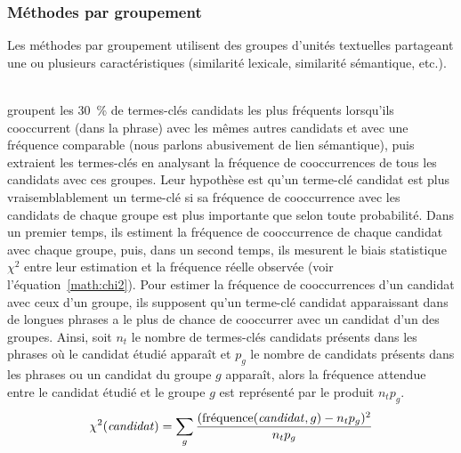       \subsubsection{Méthodes par groupement}
      \label{subsubsec:main-state_of_the_art-automatic_keyphrase_extraction-unsupervised_keyphrase_extraction-clustering_approaches}
        Les méthodes par groupement utilisent des groupes d'unités textuelles
        partageant une ou plusieurs caractéristiques (similarité lexicale,
        similarité sémantique, etc.).

        ~\\ groupent les 30~\% de termes-clés
        candidats les plus fréquents lorsqu'ils cooccurrent (dans la phrase) avec les
        mêmes autres candidats et avec une fréquence comparable (nous parlons
        abusivement de lien sémantique), puis extraient les ter\-mes-clés en
        analysant la fréquence de cooccurrences de tous les candidats avec ces groupes.
        Leur hypothèse est qu'un terme-clé candidat est plus vraisemblablement un
        terme-clé si sa fréquence de cooccurrence avec les candidats de chaque
        groupe est plus importante que selon toute probabilité. Dans un premier
        temps, ils estiment la fréquence de cooccurrence de chaque candidat avec
        chaque groupe, puis, dans un second temps, ils mesurent le biais
        statistique $\chi^2$ entre leur estimation et la fréquence réelle
        observée (voir l'équation~\ref{math:chi2}). Pour estimer la fréquence de
        cooccurrences d'un candidat avec ceux d'un groupe, ils supposent qu'un
        terme-clé candidat apparaissant dans de longues phrases a le plus de
        chance de cooccurrer avec un candidat d'un des groupes. Ainsi, soit
        $n_t$ le nombre de termes-clés candidats présents dans les phrases où le
        candidat étudié apparaît et $p_g$ le nombre de candidats présents dans
        les phrases ou un candidat du groupe $g$ apparaît, alors la fréquence
        attendue entre le candidat étudié et le groupe $g$ est représenté par le
        produit $n_tp_g$.
        \begin{align}
          \chi^2(\text{\textit{candidat}}) = \sum_{g} \frac{(\text{fréquence}(\text{\textit{candidat}}, g) - n_tp_g)^2}{n_tp_g} \label{math:chi2}
        \end{align}
        
